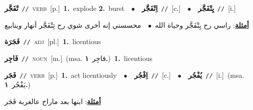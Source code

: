 \documentclass[10pt,a4paper,twoside]{article} %
\begin{document}
\begin{multicols}{2}
{\setlength\topsep{0pt}\textbf{\foreignlanguage{arabic}{تْفَجَّر}}\ {\color{gray}\texttt{//}\color{black}}\ \textsc{verb}\ [p.]\ \textbf{1.}~explode  \textbf{2.}~burst\ \ $\bullet$\ \ \setlength\topsep{0pt}\textbf{\foreignlanguage{arabic}{اِتْفَجَّر}}\ {\color{gray}\texttt{//}\color{black}}\ [c.]\ \ $\bullet$\ \ \setlength\topsep{0pt}\textbf{\foreignlanguage{arabic}{يِتْفَجَّر}}\ {\color{gray}\texttt{//}\color{black}}\ [i.]\  \begin{flushright}\color{gray}\foreignlanguage{arabic}{\textbf{\underline{\foreignlanguage{arabic}{أمثلة}}}: راسي رح يِتْفَجَّر وحياة الله\ $\bullet$\ \  محسسني إنه أخرى شوي رح تِتْفَجَّر أنهار وينابيع}\end{flushright}\color{black}} \vspace{2mm}

{\setlength\topsep{0pt}\textbf{\foreignlanguage{arabic}{فَجَرَة}}\ {\color{gray}\texttt{//}\color{black}}\ \textsc{adj}\ [pl.]\ \textbf{1.}~licentious\ } \vspace{2mm}

{\setlength\topsep{0pt}\textbf{\foreignlanguage{arabic}{فَاجِر}}\ {\color{gray}\texttt{//}\color{black}}\ \textsc{noun}\ [m.]\ \color{gray}(msa. \foreignlanguage{arabic}{فاجِر}~\foreignlanguage{arabic}{\textbf{١.}})\color{black}\ \textbf{1.}~licentious\ } \vspace{2mm}

{\setlength\topsep{0pt}\textbf{\foreignlanguage{arabic}{فَجَر}}\ {\color{gray}\texttt{//}\color{black}}\ \textsc{verb}\ [p.]\ \textbf{1.}~act licentiously\ \ $\bullet$\ \ \setlength\topsep{0pt}\textbf{\foreignlanguage{arabic}{اِفْجُر}}\ {\color{gray}\texttt{//}\color{black}}\ [c.]\ \ $\bullet$\ \ \setlength\topsep{0pt}\textbf{\foreignlanguage{arabic}{يُفْجُر}}\ {\color{gray}\texttt{//}\color{black}}\ [i.]\ \color{gray}(msa. \foreignlanguage{arabic}{يَفْجُر}~\foreignlanguage{arabic}{\textbf{١.}})\color{black}\  \begin{flushright}\color{gray}\foreignlanguage{arabic}{\textbf{\underline{\foreignlanguage{arabic}{أمثلة}}}: ابنها بعد ماراح عالغربة فَجَر}\end{flushright}\color{black}} \vspace{2mm}


\end{multicols}
\end{document}
